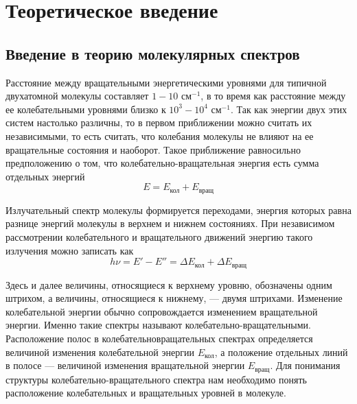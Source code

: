 \section{Теоретическое введение}
\subsection{Введение в теорию молекулярных спектров}
Расстояние между вращательными энергетическими уровнями для
типичной двухатомной молекулы составляет $1-10$ см$^{-1}$, в то время
как расстояние между ее колебательными уровнями близко к $10^3-
10^4$ см$^{-1}$. Так как энергии двух этих систем настолько различны, то в
первом приближении можно считать их независимыми, то есть считать,
что колебания молекулы не влияют на ее вращательные состояния и
наоборот. Такое приближение равносильно предположению о том, что
колебательно-вращательная энергия есть сумма отдельных энергий
\begin{equation}
E=E_{\text{кол}} + E_{\text{вращ}}
\end{equation}

Излучательный спектр молекулы формируется переходами, энергия
которых равна разнице энергий молекулы в верхнем и нижнем состояниях. При независимом рассмотрении колебательного и вращательного
движений энергию такого излучения можно записать как
\begin{equation}
h\nu=E'-E''=\Delta E_{\text{кол}} + \Delta E_{\text{вращ}}
\end{equation}

Здесь и далее величины, относящиеся к верхнему уровню, обозначены одним штрихом, а величины, относящиеся к нижнему, --- двумя
штрихами. Изменение колебательной энергии обычно сопровождается изменением вращательной энергии. Именно такие спектры называют колебательно-вращательными. Расположение полос в колебательновращательных спектрах определяется величиной изменения колебательной энергии $E_{\text{кол}}$, а положение отдельных линий в полосе — величиной изменения вращательной энергии $E_{\text{вращ}}$.
Для понимания структуры колебательно-вращательного спектра нам
необходимо понять расположение колебательных и вращательных уровней в молекуле.
